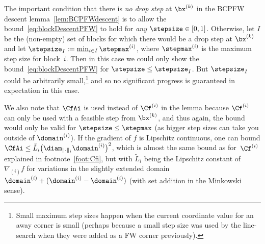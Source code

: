 \documentclass{article}
\begin{document}
\begin{remark}
The important condition that there is \emph{no drop step} at $\bx^{(k)}$ in the BCPFW descent lemma~\ref{lem:BCPFWdescent} is to allow the bound~\eqref{eq:blockDescentPFW} to hold for \emph{any} $\stepsize \in [0,1]$. Otherwise, let $I$ be the (non-empty) set of blocks for which there would be a drop step at $\bx^{(k)}$ and let $\stepsize_I := \min_{i \in I}  \stepmax^{(i)}$, where $\stepmax^{(i)}$ is the maximum step size for block~$i$. Then in this case we could only show the bound~\eqref{eq:blockDescentPFW} for $\stepsize \leq \stepsize_I$. But $\stepsize_I$ could be arbitrarily small,\footnote{Small maximum step sizes happen when the current coordinate value for an away corner is small (perhaps because a small step size was used by the line-search when they were added as a FW corner previously).} and so no significant progress is guaranteed in expectation in this case. 

We also note that $\CfAi$ is used instead of $\Cf^{(i)}$ in the lemma because $\Cf^{(i)}$ can only be used with a feasible step from $\bx^{(k)}$, and thus again, the bound would only be valid for $\stepsize \leq \stepmax$ (as bigger step sizes can take you outside of $\domain^{(i)}$). If the gradient of $f$ is Lipschitz continuous, one can bound $\CfAi \leq \tilde{L}_i \big(\diam_{\|\cdot\|_i} \domain^{(i)} \big)^2$, which is almost the same bound as for~$\Cf^{(i)}$ explained in footnote~\ref{foot:Cfi}, but with $\tilde{L}_i$ being the Lipschitz constant of $\nabla_{(i)} f$ for variations in the slightly extended domain $\domain^{(i)} + (\domain^{(i)} - \domain^{(i)})$ (with set addition in the Minkowski sense).
\end{remark}
\end{document}
